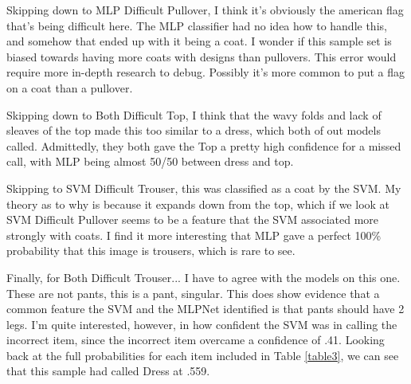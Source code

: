 \documentclass[12pt]{article}
\begin{document}
Skipping down to MLP Difficult Pullover, I think it's obviously the american flag that's being difficult here. The MLP classifier 
had no idea how to handle this, and somehow that ended up with it being a coat. I wonder if this sample set is biased towards having 
more coats with designs than pullovers. This error would require more in-depth research to debug. Possibly it's more common 
to put a flag on a coat than a pullover.

Skipping down to Both Difficult Top, I think that the wavy folds and lack of sleaves of the top made this too similar to a dress, 
which both of out models called. Admittedly, they both gave the Top a pretty high confidence for a missed call, with MLP 
being almost 50/50 between dress and top.

Skipping to SVM Difficult Trouser, this was classified as a coat by the SVM. My theory as to why is because it expands down from 
the top, which if we look at SVM Difficult Pullover seems to be a feature that the SVM associated more strongly with coats. I find 
it more interesting that MLP gave a perfect 100\% probability that this image is trousers, which is rare to see.



Finally, for Both Difficult Trouser... I have to agree with the models on this one. These are not pants, this is a pant, singular.
This does show evidence that a common feature the SVM and the MLPNet identified is that pants should have 2 legs. I'm quite 
interested, however, in how confident the SVM was in calling the incorrect item, since the incorrect item overcame a confidence
of .41. Looking back at the full probabilities for each item included in Table \ref{table3}, we can see that this sample had 
called Dress at .559. 
\end{document}
